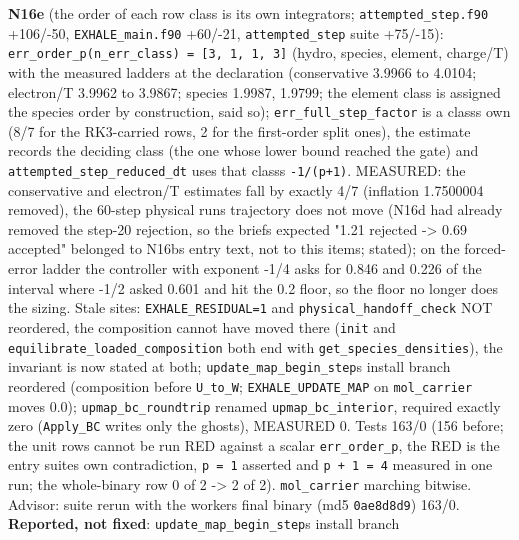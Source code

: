 \documentclass[english,a4paper]{my_memo}
\begin{document}
\begin{itemize}
  \textbf{N16e} (the order of each row class is its own integrator\textquotesingle s;
  \texttt{attempted\_step.f90} +106/-50, \texttt{EXHALE\_main.f90} +60/-21, \texttt{attempted\_step}
  suite +75/-15): \texttt{err\_order\_p(n\_err\_class)\ =\ {[}3,\ 1,\ 1,\ 3{]}} (hydro, species,
  element, charge/T) with the measured ladders at the declaration
  (conservative 3.9966 to 4.0104; electron/T 3.9962 to 3.9867; species
  1.9987, 1.9799; the element class is assigned the species\textquotesingle{} order by
  construction, said so); \texttt{err\_full\_step\_factor} is a class\textquotesingle s own (8/7 for
  the RK3-carried rows, 2 for the first-order split ones), the estimate
  records the deciding class (the one whose lower bound reached the gate)
  and \texttt{attempted\_step\_reduced\_dt} uses that class\textquotesingle s \texttt{-1/(p+1)}. MEASURED:
  the conservative and electron/T estimates fall by exactly 4/7 (inflation
  1.7500004 removed), the 60-step physical run\textquotesingle s trajectory does not move
  (N16d had already removed the step-20 rejection, so the brief\textquotesingle s expected
  "1.21 rejected -\textgreater{} 0.69 accepted" belonged to N16b\textquotesingle s entry text, not to
  this item\textquotesingle s; stated); on the forced-error ladder the controller with
  exponent -1/4 asks for 0.846 and 0.226 of the interval where -1/2 asked
  0.601 and hit the 0.2 floor, so the floor no longer does the sizing.
  Stale sites: \texttt{EXHALE\_RESIDUAL=1} and \texttt{physical\_handoff\_check} NOT
  reordered, the composition cannot have moved there (\texttt{init} and
  \texttt{equilibrate\_loaded\_composition} both end with \texttt{get\_species\_densities}),
  the invariant is now stated at both; \texttt{update\_map\_begin\_step}\textquotesingle s install
  branch reordered (composition before \texttt{U\_to\_W}; \texttt{EXHALE\_UPDATE\_MAP} on
  \texttt{mol\_carrier} moves 0.0); \texttt{upmap\_bc\_roundtrip} renamed
  \texttt{upmap\_bc\_interior}, required exactly zero (\texttt{Apply\_BC} writes only the
  ghosts), MEASURED 0. Tests 163/0 (156 before; the unit rows cannot be run
  RED against a scalar \texttt{err\_order\_p}, the RED is the entry suite\textquotesingle s own
  contradiction, \texttt{p\ =\ 1} asserted and \texttt{p\ +\ 1\ =\ 4} measured in one run; the
  whole-binary row 0 of 2 -\textgreater{} 2 of 2). \texttt{mol\_carrier} marching bitwise.
  Advisor: suite rerun with the worker\textquotesingle s final binary (md5 \texttt{0ae8d8d9})
  163/0. \textbf{Reported, not fixed}: \texttt{update\_map\_begin\_step}\textquotesingle s install branch

\end{itemize}
\end{document}
